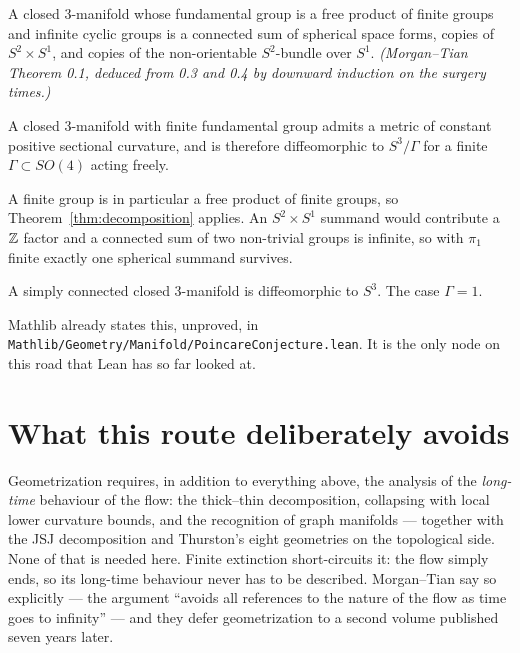 \begin{theorem}[Decomposition]
  \label{thm:decomposition}
  A closed $3$-manifold whose fundamental group is a free product of finite
  groups and infinite cyclic groups is a connected sum of spherical space forms,
  copies of $S^2 \times S^1$, and copies of the non-orientable $S^2$-bundle over
  $S^1$. \emph{(Morgan--Tian Theorem 0.1, deduced from 0.3 and 0.4 by downward
  induction on the surgery times.)}
\end{theorem}

\begin{theorem}
  \label{thm:space-form}
  A closed $3$-manifold with finite fundamental group admits a metric of
  constant positive sectional curvature, and is therefore diffeomorphic to
  $S^3/\Gamma$ for a finite $\Gamma \subset SO(4)$ acting freely.

  A finite group is in particular a free product of finite groups, so
  Theorem~\ref{thm:decomposition} applies. An $S^2 \times S^1$ summand would
  contribute a $\mathbb{Z}$ factor and a connected sum of two non-trivial groups is
  infinite, so with $\pi_1$ finite exactly one spherical summand survives.
\end{theorem}

\begin{corollary}
  \label{cor:poincare}
  A simply connected closed $3$-manifold is diffeomorphic to $S^3$. The case
  $\Gamma = 1$.

  Mathlib already states this, unproved, in
  \texttt{Mathlib/Geometry/Manifold/PoincareConjecture.lean}. It is the only
  node on this road that Lean has so far looked at.
\end{corollary}

\section*{What this route deliberately avoids}

Geometrization requires, in addition to everything above, the analysis of the
\emph{long-time} behaviour of the flow: the thick--thin decomposition,
collapsing with local lower curvature bounds, and the recognition of graph
manifolds --- together with the JSJ decomposition and Thurston's eight
geometries on the topological side. None of that is needed here. Finite
extinction short-circuits it: the flow simply ends, so its long-time behaviour
never has to be described. Morgan--Tian say so explicitly --- the argument
``avoids all references to the nature of the flow as time goes to infinity'' ---
and they defer geometrization to a second volume published seven years later.

